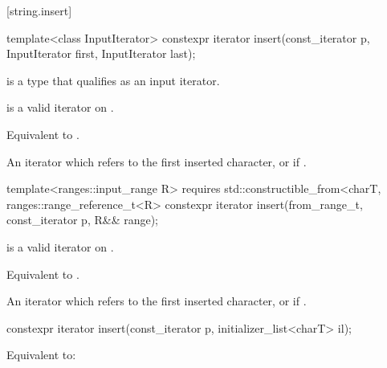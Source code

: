 \documentclass{wg21}
\begin{document}
[string.insert]{}

%
\begin{itemdecl}
    template<class InputIterator>
    constexpr iterator insert(const_iterator p, InputIterator first, InputIterator last);
\end{itemdecl}

\begin{itemdescr}
    \pnum
    \constraints
     is a type that qualifies as an input
    iterator.
    
    \pnum
    \expects
     is a valid iterator on
    .
    
    \pnum
    \effects
    Equivalent to
    .
    
    \pnum
    \returns
    An iterator which refers to the first inserted character, or
     if .
\end{itemdescr}

\begin{addedblock}
\begin{itemdecl}
    template<ranges::input_range R>
    requires std::constructible_from<charT, ranges::range_reference_t<R>
    constexpr iterator insert(from_range_t, const_iterator p, R&& range);
\end{itemdecl}

\begin{itemdescr}
     \pnum
    \expects
     is a valid iterator on .
    
    \pnum
    \effects
    Equivalent to
    .
    
    \pnum
    \returns
    An iterator which refers to the first inserted character, or
     if .
\end{itemdescr}
\end{addedblock}

%
\begin{itemdecl}
    constexpr iterator insert(const_iterator p, initializer_list<charT> il);
\end{itemdecl}
\begin{itemdescr}
    \pnum
    \effects Equivalent to: 
\end{itemdescr}
\end{document}

